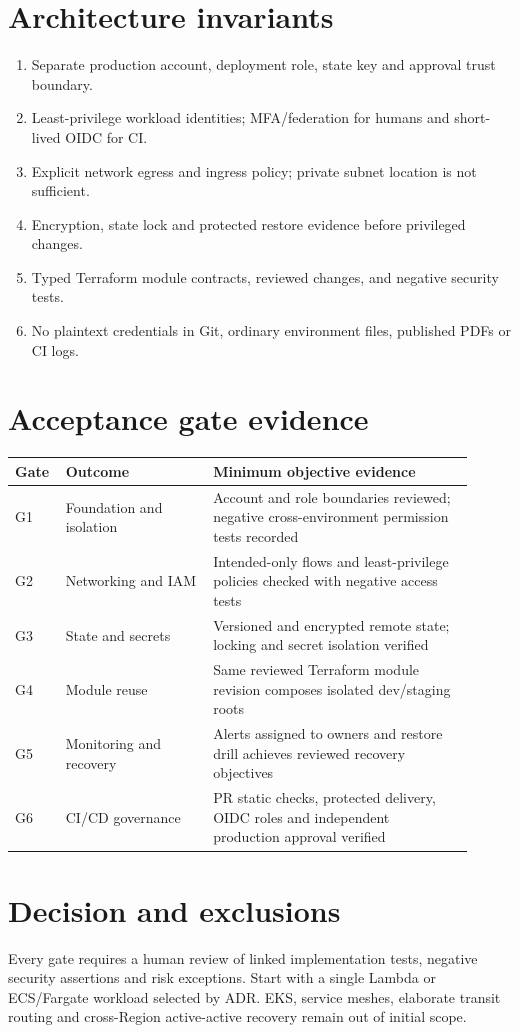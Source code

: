 \documentclass[11pt,letterpaper]{article}
\begin{document}
\section{Architecture invariants}
\begin{enumerate}
\item Separate production account, deployment role, state key and approval trust boundary.
\item Least-privilege workload identities; MFA/federation for humans and short-lived OIDC for CI.
\item Explicit network egress and ingress policy; private subnet location is not sufficient.
\item Encryption, state lock and protected restore evidence before privileged changes.
\item Typed Terraform module contracts, reviewed changes, and negative security tests.
\item No plaintext credentials in Git, ordinary environment files, published PDFs or CI logs.
\end{enumerate}

\section{Acceptance gate evidence}
\begin{longtable}{@{}p{0.08\linewidth}p{0.30\linewidth}p{0.53\linewidth}@{}}
\toprule Gate & Outcome & Minimum objective evidence \\ \midrule \endhead
G1 & Foundation and isolation & Account and role boundaries reviewed; negative cross-environment permission tests recorded \\
G2 & Networking and IAM & Intended-only flows and least-privilege policies checked with negative access tests \\
G3 & State and secrets & Versioned and encrypted remote state; locking and secret isolation verified \\
G4 & Module reuse & Same reviewed Terraform module revision composes isolated dev/staging roots \\
G5 & Monitoring and recovery & Alerts assigned to owners and restore drill achieves reviewed recovery objectives \\
G6 & CI/CD governance & PR static checks, protected delivery, OIDC roles and independent production approval verified \\
\bottomrule\end{longtable}
\section{Decision and exclusions}
Every gate requires a human review of linked implementation tests, negative security assertions and risk exceptions. Start with a single Lambda or ECS/Fargate workload selected by ADR. EKS, service meshes, elaborate transit routing and cross-Region active-active recovery remain out of initial scope.
\end{document}
